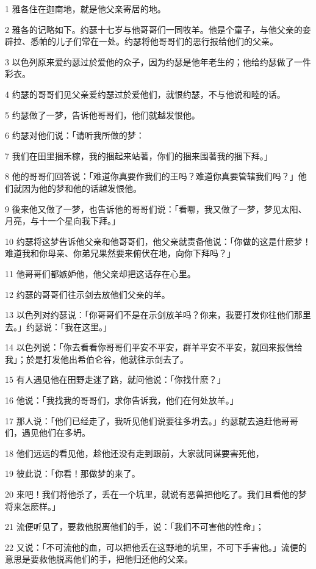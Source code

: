 \par 1 雅各住在迦南地，就是他父亲寄居的地。
\par 2 雅各的记略如下。约瑟十七岁与他哥哥们一同牧羊。他是个童子，与他父亲的妾辟拉、悉帕的儿子们常在一处。约瑟将他哥哥们的恶行报给他们的父亲。
\par 3 以色列原来爱约瑟过於爱他的众子，因为约瑟是他年老生的；他给约瑟做了一件彩衣。
\par 4 约瑟的哥哥们见父亲爱约瑟过於爱他们，就恨约瑟，不与他说和睦的话。
\par 5 约瑟做了一梦，告诉他哥哥们，他们就越发恨他。
\par 6 约瑟对他们说：「请听我所做的梦：
\par 7 我们在田里捆禾稼，我的捆起来站著，你们的捆来围著我的捆下拜。」
\par 8 他的哥哥们回答说：「难道你真要作我们的王吗？难道你真要管辖我们吗？」他们就因为他的梦和他的话越发恨他。
\par 9 後来他又做了一梦，也告诉他的哥哥们说：「看哪，我又做了一梦，梦见太阳、月亮，与十一个星向我下拜。」
\par 10 约瑟将这梦告诉他父亲和他哥哥们，他父亲就责备他说：「你做的这是什麽梦！难道我和你母亲、你弟兄果然要来俯伏在地，向你下拜吗？」
\par 11 他哥哥们都嫉妒他，他父亲却把这话存在心里。
\par 12 约瑟的哥哥们往示剑去放他们父亲的羊。
\par 13 以色列对约瑟说：「你哥哥们不是在示剑放羊吗？你来，我要打发你往他们那里去。」约瑟说：「我在这里。」
\par 14 以色列说：「你去看看你哥哥们平安不平安，群羊平安不平安，就回来报信给我」；於是打发他出希伯仑谷，他就往示剑去了。
\par 15 有人遇见他在田野走迷了路，就问他说：「你找什麽？」
\par 16 他说：「我找我的哥哥们，求你告诉我，他们在何处放羊。」
\par 17 那人说：「他们已经走了，我听见他们说要往多坍去。」约瑟就去追赶他哥哥们，遇见他们在多坍。
\par 18 他们远远的看见他，趁他还没有走到跟前，大家就同谋要害死他，
\par 19 彼此说：「你看！那做梦的来了。
\par 20 来吧！我们将他杀了，丢在一个坑里，就说有恶兽把他吃了。我们且看他的梦将来怎麽样。」
\par 21 流便听见了，要救他脱离他们的手，说：「我们不可害他的性命」；
\par 22 又说：「不可流他的血，可以把他丢在这野地的坑里，不可下手害他。」流便的意思是要救他脱离他们的手，把他归还他的父亲。
